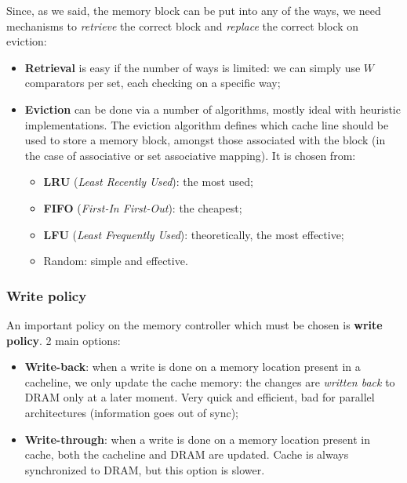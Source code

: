 \documentclass[a4paper,11pt]{article}
\begin{document}
Since, as we said, the memory block can be put into any of the ways, we need mechanisms to \textit{retrieve} the correct block and \textit{replace} the correct block on eviction:
\begin{itemize}
	\item \textbf{Retrieval} is easy if the number of ways is limited: we can simply use $W$ comparators per set, each checking on a specific way;
	\item \textbf{Eviction} can be done via a number of algorithms, mostly ideal with heuristic implementations. The eviction algorithm defines which cache line should be used to store a
	      memory block, amongst those associated with the
	      block (in the case of associative or set associative
	      mapping).
	      It is chosen from:
	      \begin{itemize}
		      \item \textbf{LRU} (\textit{Least Recently Used}): the most used;
		      \item \textbf{FIFO} (\textit{First-In First-Out}): the cheapest;
		      \item \textbf{LFU} (\textit{Least Frequently Used}): theoretically, the most effective;
		      \item Random: simple and effective.
	      \end{itemize}
\end{itemize}

\subsubsection{Write policy}

An important policy on the memory controller which must be chosen is \textbf{write policy}.
2 main options:
\begin{itemize}
	\item \textbf{Write-back}: when a write is done on a memory location present in a cacheline, we only update the cache memory: the changes are \textit{written back} to DRAM only at a later moment. Very quick and efficient, bad for parallel architectures (information goes out of sync);
	\item \textbf{Write-through}: when a write is done on a memory location present in cache, both the cacheline and DRAM are updated. Cache is always synchronized to DRAM, but this option is slower.
\end{itemize}
\end{document}
